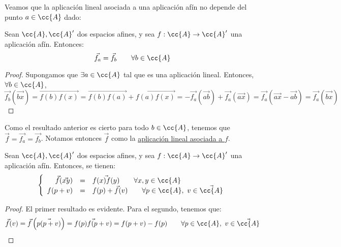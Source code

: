 Veamos que la aplicación lineal asociada a una aplicación afín no depende del punto $a\in \cc{A}$ dado:
\begin{prop}
    Sean $\cc{A}, \cc{A}'$ dos espacios afines, y sea $f:\cc{A}\to \cc{A}'$ una aplicación afín. Entonces:
    \begin{equation*}
        \vec{f_a} = \vec{f_b} \qquad \forall b\in \cc{A}
    \end{equation*}
\end{prop}
\begin{proof}
    Supongamos que $\exists a\in \cc{A}$ tal que
    es una aplicación lineal. Entonces, $\forall b\in \cc{A}$,
    \begin{equation*}
        \vec{f_b}(\vec{bx}) = \vec{f(b)f(x)} = \vec{f(b)f(a)} + \vec{f(a)f(x)} = -\vec{f_a}(\vec{ab}) + \vec{f_a}(\vec{ax})
        = \vec{f_a}(\vec{ax}-\vec{ab}) = \vec{f_a}(\vec{bx})
    \end{equation*}
\end{proof}

Como el resultado anterior es cierto para todo $b\in \cc{A}$, tenemos que $\vec{f}=\vec{f_a} = \vec{f_b}$. Notamos entonces $\vec{f}$ como la \ul{aplicación lineal asociada a $f$}.

\begin{coro}
    Sean $\cc{A}, \cc{A}'$ dos espacios afines, y sea $f:\cc{A}\to \cc{A}'$ una aplicación afín. Entonces, se tienen:
    \begin{equation*}
        \left\{
        \begin{array}{rcl}
            \vec{f}(\vec{xy}) &=& \vec{f(x)f(y)} \qquad \forall x,y\in \cc{A} \\
            f(p+v)&=& f(p)+\vec{f}(v) \qquad \forall p\in \cc{A},~v\in \vec{\cc{A}}
        \end{array}
        \right.
    \end{equation*}
\end{coro}
\begin{proof}
    El primer resultado es evidente. Para el segundo, tenemos que:
    \begin{equation*}
        \vec{f}(v) = \vec{f}\left(\vec{p(p+v)}\right)
        = \vec{f(p)f(p+v)} = f(p+v) - f(p) \qquad \forall p\in \cc{A},~v\in \vec{\cc{A}}
    \end{equation*}
\end{proof}


